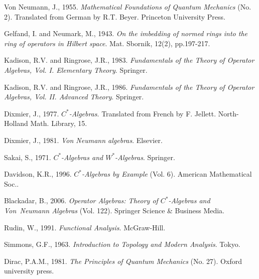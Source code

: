 \documentclass[11pt,a4paper]{report}
\theoremstyle{plain}
\theoremstyle{definition}
\newcommand{\1}{\mathbbm{1}}
\begin{document}
\begin{thebibliography}{00}
	Von Neumann, J., 1955.
	\emph{Mathematical Foundations of Quantum Mechanics} (No. 2). 
	Translated from German by R.T. Beyer.
	Princeton University Press.

	Gelfand, I. and Neumark, M., 1943. 
	\emph{On the imbedding of normed rings into the ring of operators in Hilbert 
	space}. 
	Mat. Sbornik, 12(2), pp.197-217.
	
	Kadison, R.V. and Ringrose, J.R., 1983. 
	\emph{Fundamentals of the Theory of Operator Algebras, Vol. I. Elementary Theory}. 
	Springer.

	Kadison, R.V. and Ringrose, J.R., 1986. 
	\emph{Fundamentals of the Theory of Operator Algebras, Vol. II. Advanced Theory}. 
	Springer.

	Dixmier, J., 1977. \emph{$C^\ast$-Algebras}. 
	Translated from French by F. Jellett. 
	North-Holland Math. Library, 15.
	
	Dixmier, J., 1981. 
	\emph{Von Neumann algebras}. 
	Elsevier.

	Sakai, S., 1971. 
	\emph{$C^\ast$-Algebras and $W^\ast$-Algebras}. 
	Springer.

	Davidson, K.R., 1996. 
	\emph{$C^\ast$-Algebras by Example} (Vol. 6). 
	American Mathematical Soc..
	
	Blackadar, B., 2006. 
	\emph{Operator Algebras: Theory of $C^\ast$-Algebras and Von~Neumann 
	Algebras} (Vol. 122). 
	Springer Science \& Business Media.

	Rudin, W., 1991. 
	\emph{Functional Analysis}. 
	McGraw-Hill.
	
	Simmons, G.F., 1963. 
	\emph{Introduction to Topology and Modern Analysis}. 
	Tokyo.

	Dirac, P.A.M., 1981. 
	\emph{The Principles of Quantum Mechanics} (No. 27). 
	Oxford university press.
\end{thebibliography}
\end{document}
